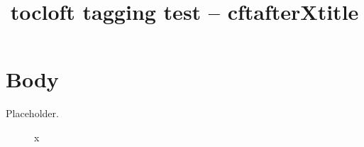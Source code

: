 \documentclass{report}
\title{tocloft tagging test -- cftafterXtitle}
\begin{document}
\tableofcontents
\listoffigures
\chapter{Body}
Placeholder.
\begin{figure}\caption{x}\end{figure}
\end{document}
